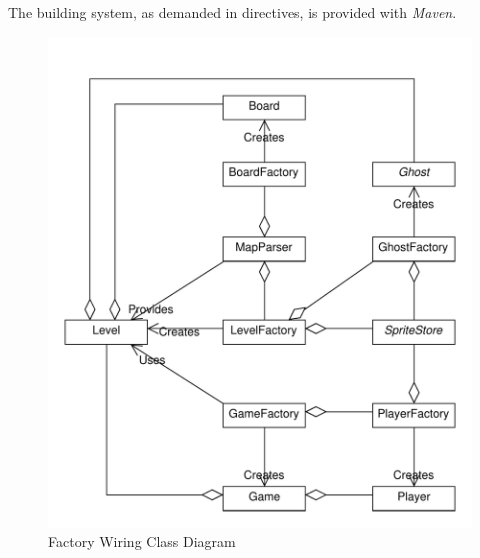 \documentclass[]{article}
\begin{document}
The building system, as demanded in directives, is provided with \textit{Maven}.

\begin{figure}[h]
    \centering
    \includegraphics[scale=0.4]{imgs/FactoryWiring.pdf}
    \caption{Factory Wiring Class Diagram}
    \label{fig:FactoryWiringClassDiagram}
\end{figure}
\end{document}

